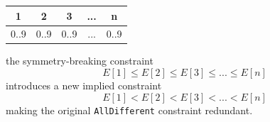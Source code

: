 \documentclass[CS4402-Notes.tex]{subfiles}
\begin{document}
\begin{table}[H]
\centering
\begin{tabular}{| c | c | c | c | c |}
  \hline
  \textbf{1} & \textbf{2} & \textbf{3} & ... & \textbf{n} \\
  \hline
  0..9 & 0..9 & 0..9 & ... & 0..9 \\
  \hline
\end{tabular}
\end{table}
the symmetry-breaking constraint
\begin{equation*}
  E[1] \leq  E[2] \leq E[3] \leq ... \leq E[n]
\end{equation*}
introduces a new implied constraint
\begin{equation*}
E[1] < E[2] < E[3] < ... < E[n]
\end{equation*}
making the original \texttt{AllDifferent} constraint redundant. 
\end{document}
